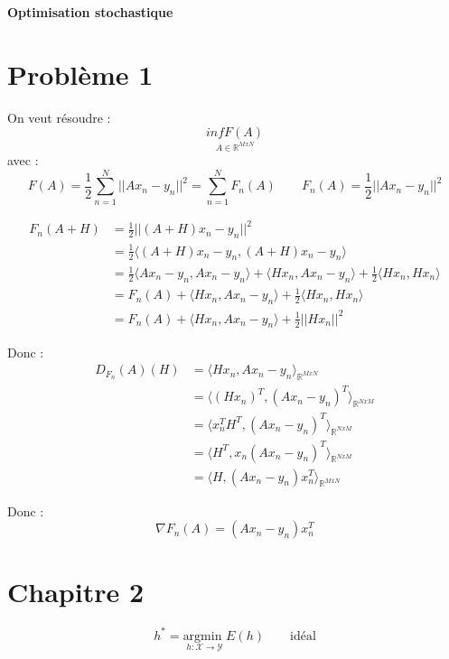 \documentclass[12pt,a4paper]{article}
\begin{document}
\begin{center}
    \textbf{Optimisation stochastique}\\
\end{center}

\section*{Problème 1}
On veut résoudre :
\begin{equation}
    \underset{A \in \mathbb{R}^{MxN}}{inf F(A)}
\end{equation}
avec :
$$
F(A)  = \frac{1}{2}\sum_{n=1}^N ||Ax_n - y_n ||^2 = \sum_{n=1}^N F_n(A)
\quad \quad F_n(A) = \frac{1}{2}||Ax_n - y_n ||^2
$$

\begin{align*}
    F_n(A + H) &= \frac{1}{2}||(A+H)x_n - y_n ||^2\\
    &= \frac{1}{2}\langle (A+H)x_n - y_n, (A+H)x_n - y_n \rangle\\
    &= \frac{1}{2}\langle Ax_n - y_n, Ax_n - y_n \rangle + \langle Hx_n, Ax_n - y_n \rangle + \frac{1}{2}\langle Hx_n, Hx_n \rangle\\
    &= F_n(A) + \langle Hx_n, Ax_n - y_n \rangle + \frac{1}{2}\langle Hx_n, Hx_n \rangle\\
    &= F_n(A) + \langle Hx_n, Ax_n - y_n \rangle + \frac{1}{2}||Hx_n||^2
\end{align*}

Donc :
\begin{align*}
    D_{F_n}(A)(H) &= \langle Hx_n, Ax_n - y_n \rangle_{\mathbb{R}^{MxN}}\\
    &= \langle (Hx_n)^T, (Ax_n - y_n)^T \rangle_{\mathbb{R}^{NxM}}\\
    &= \langle x_n^T H^T, (Ax_n - y_n)^T \rangle_{\mathbb{R}^{NxM}}\\
    &= \langle H^T, x_n(Ax_n - y_n)^T \rangle_{\mathbb{R}^{NxM}}\\
    &= \langle H, (Ax_n - y_n)x_n^T \rangle_{\mathbb{R}^{MxN}}
\end{align*}

Donc :
$$
\nabla F_n(A) = (Ax_n - y_n)x_n^T
$$


\section*{Chapitre 2}

\begin{equation}
    h^* = \underset{h : \mathcal{X} \rightarrow \mathcal{Y}}{\text{argmin }} E(h) \qquad \text{idéal}
\end{equation}
\end{document}

